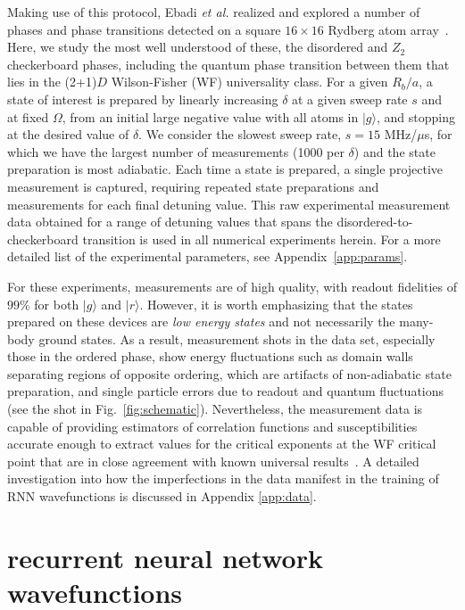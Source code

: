 \documentclass[twocolumn,
                showpacs,
                nofootinbib,
                nobibnotes,
                aps,
                superscriptaddress,
                amssymb,
                amsmath,
                floatfix,
                reprint,
                prx, 
                notitlepage,
                showkeys,
                10pt,
		]{revtex4-2}
\begin{document}
Making use of this protocol, Ebadi {\it et al.} realized and explored a number of phases and phase transitions detected on a square $16 \times 16$ Rydberg atom array~\cite{ebadi2021quantum}. 
Here, we study the most well understood of these, the disordered and $Z_2$ checkerboard phases, including the quantum phase transition between them that lies in the (2+1)$D$ Wilson-Fisher (WF) universality class.
For a given $R_b/a$, a state of interest is prepared by linearly increasing $\delta$ at a given sweep rate $s$ and at fixed $\Omega$, from an initial large negative value with all atoms in $| g \rangle$, and stopping at the desired value of $\delta$.
We consider the slowest sweep rate, $s=15$ MHz/$\mu$s, for which we have the largest number of measurements (1000 per $\delta$) and the state preparation is most adiabatic. 
Each time a state is prepared, a single projective measurement is captured, requiring repeated state preparations and measurements for each final detuning value.
This raw experimental measurement data obtained for a range of detuning values that spans the disordered-to-checkerboard transition is used in all numerical experiments herein. 
For a more detailed list of the experimental parameters, see Appendix~\ref{app:params}.

For these experiments, measurements are of high quality, with readout fidelities of $99\%$ for both $\vert g \rangle$ and $\vert r \rangle$.
However, it is worth emphasizing that the states prepared on these devices are \emph{low energy states} and not necessarily the many-body ground states. 
As a result, measurement shots in the data set, especially those in the ordered phase, show energy fluctuations such as domain walls separating regions of opposite ordering, which are artifacts of non-adiabatic state preparation, and single particle errors due to readout and quantum fluctuations (see the shot in Fig.~\ref{fig:schematic}). 
Nevertheless, the measurement data is capable of providing estimators of correlation functions and susceptibilities accurate enough to extract values for the critical exponents at the WF critical point that are in close agreement with known universal results~\cite{ebadi2021quantum, samajdar2020complex}.
A detailed investigation into how the imperfections in the data manifest in the training of RNN wavefunctions is discussed in Appendix \ref{app:data}. 

%
\section{recurrent neural network wavefunctions}
%
\end{document}
